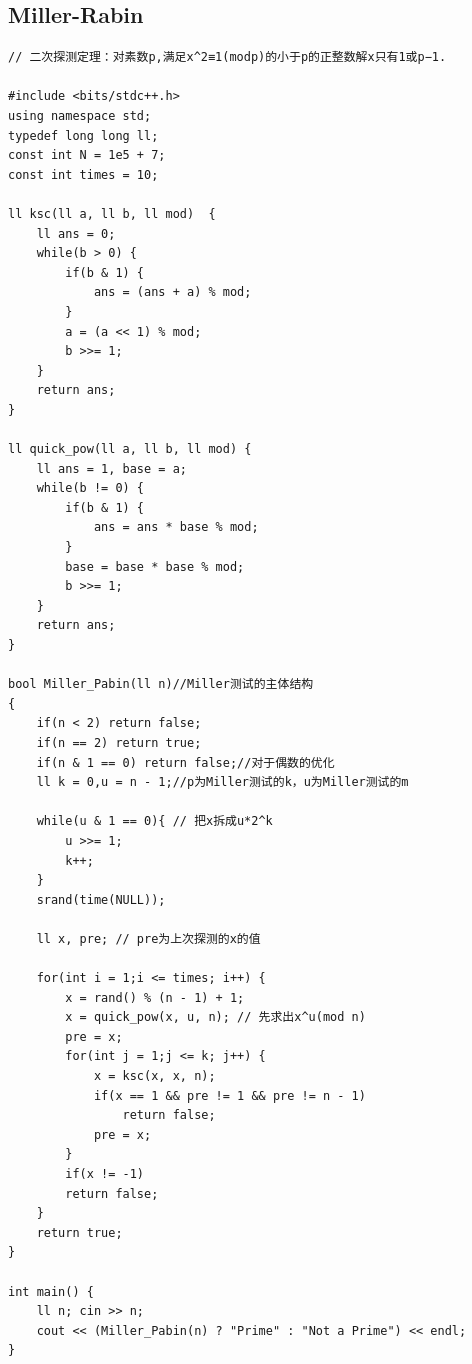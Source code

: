 \documentclass[twoside]{article}
\begin{document}
\subsection{Miller-Rabin}
\begin{lstlisting}
// 二次探测定理：对素数p,满足x^2≡1(modp)的小于p的正整数解x只有1或p−1.

#include <bits/stdc++.h>
using namespace std;
typedef long long ll;
const int N = 1e5 + 7;
const int times = 10;

ll ksc(ll a, ll b, ll mod)  {
    ll ans = 0;
    while(b > 0) {
        if(b & 1) {
            ans = (ans + a) % mod;
        }
        a = (a << 1) % mod;
        b >>= 1;
    }
    return ans;
}

ll quick_pow(ll a, ll b, ll mod) {
    ll ans = 1, base = a;
    while(b != 0) {
        if(b & 1) {
            ans = ans * base % mod;
        }
        base = base * base % mod;
        b >>= 1;
    }
    return ans;
}

bool Miller_Pabin(ll n)//Miller测试的主体结构
{
    if(n < 2) return false;
    if(n == 2) return true;
    if(n & 1 == 0) return false;//对于偶数的优化
    ll k = 0,u = n - 1;//p为Miller测试的k，u为Miller测试的m
    
    while(u & 1 == 0){ // 把x拆成u*2^k
        u >>= 1;
        k++;
    }
    srand(time(NULL));

    ll x, pre; // pre为上次探测的x的值

    for(int i = 1;i <= times; i++) {
        x = rand() % (n - 1) + 1;
        x = quick_pow(x, u, n); // 先求出x^u(mod n)
        pre = x;
        for(int j = 1;j <= k; j++) {
            x = ksc(x, x, n);
            if(x == 1 && pre != 1 && pre != n - 1)
                return false;
            pre = x;
        }
        if(x != -1)
        return false;
    }
    return true;
}
 
int main() {
    ll n; cin >> n;
    cout << (Miller_Pabin(n) ? "Prime" : "Not a Prime") << endl;
}\end{lstlisting}
\end{document}

